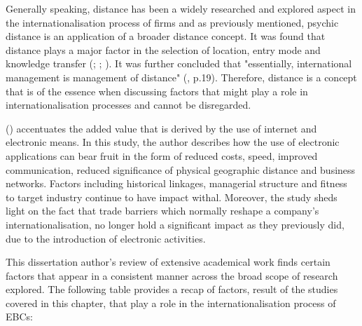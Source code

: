 \documentclass[11pt,a4paper]{article}
\begin{document}
Generally speaking, distance has been a widely researched and explored aspect in the internationalisation process of firms and as previously mentioned, psychic distance is an application of a broader distance concept. It was found that distance plays a major factor in the selection of location, entry mode and knowledge transfer (\cite{xuInstitutionalDistanceMultinational2002}; \cite{kostovaTransnationalTransferStrategic1999}; \cite{tihanyiEffectCulturalDistance2005}). It was further concluded that "essentially, international management is management of distance" (\cite{zaheerDistanceDirectionRestoring2012}, p.19). Therefore, distance is a concept that is of the essence when discussing factors that might play a role in internationalisation processes and cannot be disregarded. \par
\citeauthor{terziImpactEcommerceInternational2011} (\citeyear{terziImpactEcommerceInternational2011}) accentuates the added value that is derived by the use of internet and electronic means. In this study, the author describes how the use of electronic applications can bear fruit in the form of reduced costs, speed, improved communication, reduced significance of physical geographic distance and business networks. Factors including historical linkages, managerial structure and fitness to target industry continue to have impact withal. Moreover, the study sheds light on the fact that trade barriers which normally reshape a company's internationalisation, no longer hold a significant impact as they previously did, due to the introduction of electronic activities. \par

This dissertation author's review of extensive academical work finds certain factors that appear in a consistent manner across the broad scope of research explored. The following table provides a recap of factors, result of the studies covered in this chapter, that play a role in the internationalisation process of EBCs:
\end{document}
